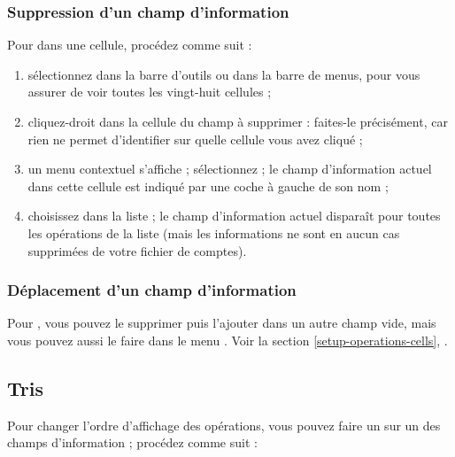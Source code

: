 \subsubsection{Suppression d'un champ d'information\label{transactions-list-fields-remove}}

Pour  dans une cellule, procédez comme suit :

\begin{enumerate}
	 \item sélectionnez  dans la barre d'outils ou  dans la barre de menus, pour vous assurer de voir toutes les vingt-huit cellules ;
	 \item cliquez-droit dans la cellule du champ à supprimer : faites-le précisément, car rien ne permet d'identifier sur quelle cellule vous avez cliqué ;
	 \item un menu contextuel s'affiche ; sélectionnez  ; le champ d'information actuel dans cette cellule est indiqué par une coche à gauche de son nom ;
	 \item choisissez  dans la liste ; le champ d'information actuel disparaît pour toutes les opérations de la liste (mais les informations ne sont en aucun cas supprimées de votre fichier de comptes).
\end{enumerate}

\subsubsection{Déplacement d'un champ d'information\label{transactions-list-fields-move}}

Pour , vous pouvez le supprimer puis l'ajouter dans un autre champ vide, mais vous pouvez aussi le faire dans le menu . Voir la section \vref{setup-operations-cells}, .


\subsection{Tris\label{transactions-list-sorts}}

Pour changer l'ordre d'affichage des opérations, vous pouvez faire un  sur un des champs d'information ; procédez comme suit :


